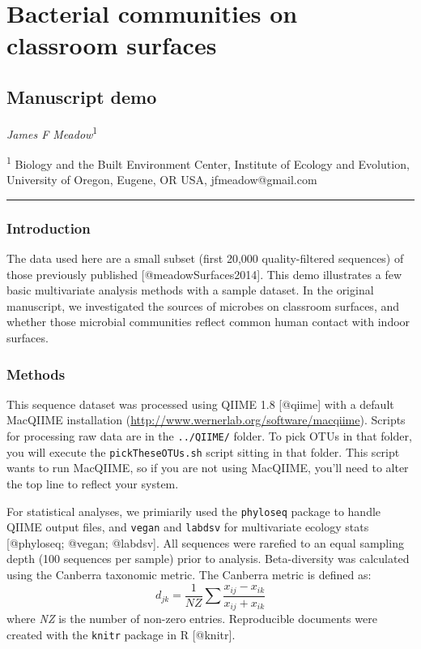 \section{Bacterial communities on classroom surfaces}

\subsection{Manuscript demo}

\emph{James F Meadow}\textsuperscript{1}

\textsuperscript{1} Biology and the Built Environment Center, Institute
of Ecology and Evolution, University of Oregon, Eugene, OR USA,
jfmeadow@gmail.com

\begin{center}\rule{3in}{0.4pt}\end{center}

\subsubsection{Introduction}

The data used here are a small subset (first 20,000 quality-filtered
sequences) of those previously published {[}@meadowSurfaces2014{]}. This
demo illustrates a few basic multivariate analysis methods with a sample
dataset. In the original manuscript, we investigated the sources of
microbes on classroom surfaces, and whether those microbial communities
reflect common human contact with indoor surfaces.

\subsubsection{Methods}

This sequence dataset was processed using QIIME 1.8 {[}@qiime{]} with a
default MacQIIME installation
(\url{http://www.wernerlab.org/software/macqiime}). Scripts for
processing raw data are in the \texttt{../QIIME/} folder. To pick OTUs
in that folder, you will execute the \texttt{pickTheseOTUs.sh} script
sitting in that folder. This script wants to run MacQIIME, so if you are
not using MacQIIME, you'll need to alter the top line to reflect your
system.

For statistical analyses, we primiarily used the \texttt{phyloseq}
package to handle QIIME output files, and \texttt{vegan} and
\texttt{labdsv} for multivariate ecology stats {[}@phyloseq; @vegan;
@labdsv{]}. All sequences were rarefied to an equal sampling depth (100
sequences per sample) prior to analysis. Beta-diversity was calculated
using the Canberra taxonomic metric. The Canberra metric is defined as:
\[ d_{jk} = \frac{1}{NZ} \sum \frac{x_{ij}-x_{ik}}{x_{ij}+x_{ik}} \]
where \emph{NZ} is the number of non-zero entries. Reproducible
documents were created with the \texttt{knitr} package in R
{[}@knitr{]}.

